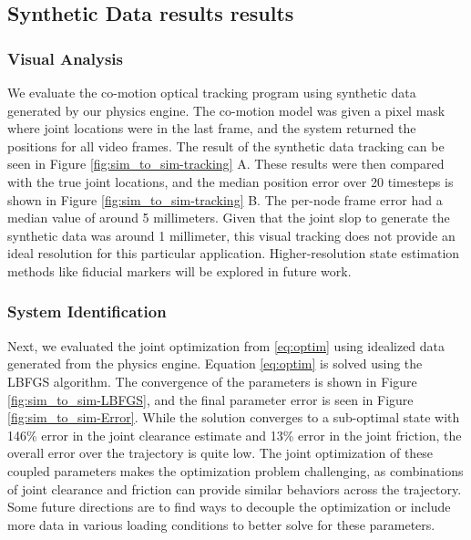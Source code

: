 \subsection{Synthetic Data results results}
\subsubsection{Visual Analysis}
We evaluate the co-motion optical tracking program using synthetic data generated by our physics engine. The co-motion model was given a pixel mask where joint locations were in the last frame, and the system returned the positions for all video frames. The result of the synthetic data tracking can be seen in Figure \ref{fig:sim_to_sim-tracking} A. These results were then compared with the true joint locations, and the median position error over 20 timesteps is shown in Figure \ref{fig:sim_to_sim-tracking} B. The per-node frame error had a median value of around 5 millimeters. Given that the joint slop to generate the synthetic data was around 1 millimeter, this visual tracking does not provide an ideal resolution for this particular application. Higher-resolution state estimation methods like fiducial markers will be explored in future work. 

\subsubsection{System Identification}
Next, we evaluated the joint optimization from \eqref{eq:optim} using idealized data generated from the physics engine. Equation \eqref{eq:optim} is solved using the LBFGS algorithm. The convergence of the parameters is shown in Figure \ref{fig:sim_to_sim-LBFGS}, and the final parameter error is seen in Figure \ref{fig:sim_to_sim-Error}. While the solution converges to a sub-optimal state with 146\% error in the joint clearance estimate and 13\% error in the joint friction, the overall error over the trajectory is quite low. The joint optimization of these coupled parameters makes the optimization problem challenging, as combinations of joint clearance and friction can provide similar behaviors across the trajectory. Some future directions are to find ways to decouple the optimization or include more data in various loading conditions to better solve for these parameters. 

